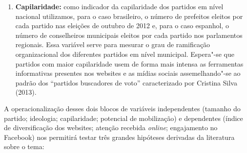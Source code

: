 \begin{enumerate}[label=\scshape\roman*]
\item\textbf{Capilaridade:} como indicador da capilaridade dos partidos
em nível nacional utilizamos, para o caso brasileiro, o número de
prefeitos eleitos por cada partido nas eleições de outubro de 2012 e,
para o caso espanhol, o número de conselheiros municipais eleitos por
cada partido nos parlamentos regionais. Essa variável serve para mesurar
o grau de ramificação organizacional dos diferentes partidos em nível
municipal. Espera"-se que partidos com maior capilaridade usem de forma
mais intensa as ferramentas informativas presentes nos websites e as
mídias sociais assemelhando"-se ao padrão dos ``partidos buscadores de
voto'' caracterizado por Cristina Silva (2013).
\end{enumerate}

A operacionalização desses dois blocos de variáveis independentes
(tamanho do partido; ideologia; capilaridade; potencial de mobilização)
e dependentes (índice de diversificação dos websites; atenção recebida
\emph{online}; engajamento no Facebook) nos permitirá testar três grandes
hipóteses derivadas da literatura sobre o tema:

